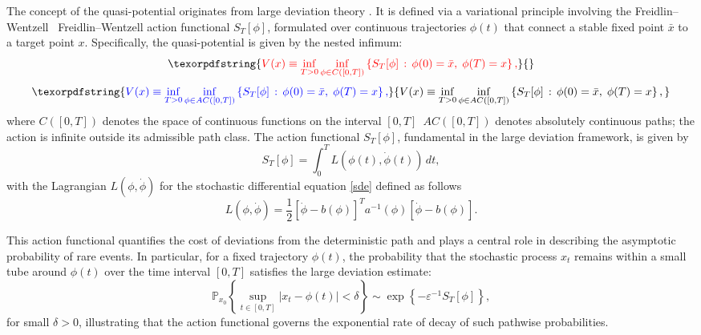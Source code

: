 \documentclass[11pt]{article}
\theoremstyle{plain}      %
\theoremstyle{definition} %
\providecommand{\DIFaddtex}[1]{{\protect\color{blue}#1}} %
\providecommand{\DIFdeltex}[1]{{\protect\color{red}#1}} %
\providecommand{\DIFaddbegin}{} %
\providecommand{\DIFaddend}{} %
\providecommand{\DIFdelbegin}{} %
\providecommand{\DIFdelend}{} %
\providecommand{\DIFadd}[1]{\texorpdfstring{\DIFaddtex{#1}}{#1}} %
\providecommand{\DIFdel}[1]{\texorpdfstring{\DIFdeltex{#1}}{}} %
\newcommand{\DIFscaledelfig}{1.0}
\newlength{\DIFdelgraphicswidth} %
\newlength{\DIFdelgraphicsheight} %
\newcommand{\DIFaddincludegraphics}[2][]{{\color{blue}\fbox{\DIFOincludegraphics[#1]{#2}}}} %
\newcommand{\DIFdelincludegraphics}[2][]{%
\sbox{\DIFdelgraphicsbox}{\DIFOincludegraphics[#1]{#2}}%
\settoboxwidth{\DIFdelgraphicswidth}{\DIFdelgraphicsbox} %
\settoboxtotalheight{\DIFdelgraphicsheight}{\DIFdelgraphicsbox} %
\scalebox{\DIFscaledelfig}{%
\parbox[b]{\DIFdelgraphicswidth}{\usebox{\DIFdelgraphicsbox}\\[-\baselineskip] \rule{\DIFdelgraphicswidth}{0em}}\llap{\resizebox{\DIFdelgraphicswidth}{\DIFdelgraphicsheight}{%
\setlength{\unitlength}{\DIFdelgraphicswidth}%
\begin{picture}(1,1)%
\thicklines\linethickness{2pt} %
{\color[rgb]{1,0,0}\put(0,0){\framebox(1,1){}}}%
{\color[rgb]{1,0,0}\put(0,0){\line( 1,1){1}}}%
{\color[rgb]{1,0,0}\put(0,1){\line(1,-1){1}}}%
\end{picture}%
}\hspace*{3pt}}} %
} %
\DeclareRobustCommand{\DIFaddbegin}{\DIFOaddbegin \let\includegraphics\DIFaddincludegraphics} %
\DeclareRobustCommand{\DIFaddend}{\DIFOaddend \let\includegraphics\DIFOincludegraphics} %
\DeclareRobustCommand{\DIFdelbegin}{\DIFOdelbegin \let\includegraphics\DIFdelincludegraphics} %
\DeclareRobustCommand{\DIFdelend}{\DIFOaddend \let\includegraphics\DIFOincludegraphics} %
\begin{document}
The concept of the quasi-potential originates from large deviation theory \cite{Freidlin2012}. It is defined via a variational principle involving the \DIFdelbegin \DIFdel{Freidlin–Wentzell }\DIFdelend\ \DIFaddbegin \DIFadd{Freidlin--Wentzell }\DIFaddend action functional \( S_T[\phi] \), formulated over continuous trajectories \( \phi(t) \) that connect a stable fixed point \( \bar{x} \) to a target point \( x \). Specifically, the quasi-potential is given by the nested infimum:
\DIFdelbegin \begin{displaymath}
\DIFdel{%
V(x) \equiv \inf_{T > 0} \inf_{\phi \in C([0, T])} \left\{ S_T[\phi] \,:\, \phi(0) = \bar{x},\; \phi(T) = x \right\},
}\end{displaymath}%
\DIFdelend \DIFaddbegin \begin{equation}
\DIFadd{\label{quasip}
V(x) \equiv \inf_{T > 0} \inf_{\phi \in AC([0, T])} \left\{ S_T[\phi] \,:\, \phi(0) = \bar{x},\; \phi(T) = x \right\},
}\end{equation}\DIFaddend 
where \DIFdelbegin \DIFdel{\( C([0,T]) \) denotes the space of continuous functions on the interval \([0, T]\)}\DIFdelend\ \DIFaddbegin \DIFadd{\(AC([0,T])\) denotes absolutely continuous paths; the action is infinite outside its admissible path class}\DIFaddend . The action functional \( S_T[\phi] \), fundamental in the large deviation framework, is given by
\begin{equation}
\label{actionf}
S_T[\phi] = \int_0^T L(\phi(t), \dot{\phi}(t))\,dt,
\end{equation}
with the Lagrangian \( L(\phi, \dot{\phi}) \) for the stochastic differential equation \eqref{sde} defined as follows
\begin{equation}
\label{Lagran}
L(\phi, \dot{\phi}) = \frac{1}{2} \left[ \dot{\phi} - b(\phi) \right]^{\!\!T} a^{-1}(\phi) \left[ \dot{\phi} - b(\phi) \right].
\end{equation}

This action functional quantifies the cost of deviations from the deterministic path and plays a central role in describing the asymptotic probability of rare events. In particular, for a fixed trajectory \( \phi(t) \), the probability that the stochastic process \( x_t \) remains within a small tube around \( \phi(t) \) over the time interval \([0, T]\) satisfies the large deviation estimate:
\begin{equation}
\label{LDP}
\mathbb{P}_{x_0} \left\{ \sup_{t \in [0, T]} \left| x_t - \phi(t) \right| < \delta \right\} \sim \exp\left\{ -\varepsilon^{-1} S_T[\phi] \right\},
\end{equation}
for small \( \delta > 0 \), illustrating that the action functional governs the exponential rate of decay of such pathwise probabilities.
\end{document}
